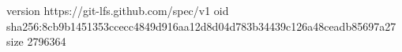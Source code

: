 version https://git-lfs.github.com/spec/v1
oid sha256:8cb9b1451353ccecc4849d916aa12d8d04d783b34439c126a48ceadb85697a27
size 2796364
